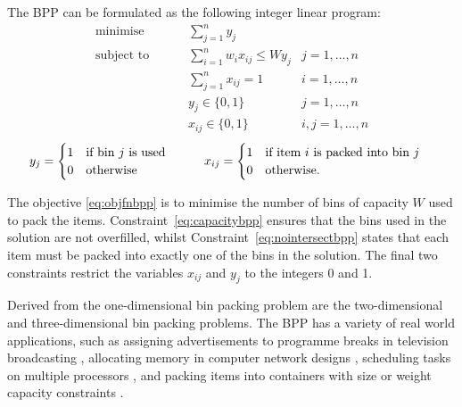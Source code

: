 \documentclass[a4paper,11pt]{article}
\begin{document}
The BPP can be formulated as the following integer linear program:
\begin{subequations}
	\begin{align}
	\text{minimise  } &\qquad \sum_{j=1}^{n} y_j & \label{eq:objfnbpp}\\[3pt]
	\text{subject to  } &\qquad \sum_{i = 1}^{n} w_i x_{ij} \leq W y_j & j = 1,\dotsc,n \label{eq:capacitybpp} \\[3pt]
	&\qquad \sum_{j=1}^{n} x_{ij} = 1 &i = 1,\dotsc,n \label{eq:nointersectbpp} \\[3pt]
	&\qquad y_j \in \{0,1\} &j = 1,\dotsc,n \label{eq:binarybppy} \\[3pt]
	&\qquad x_{ij} \in \{0,1\} &i,j = 1,\dotsc,n \label{eq:binarybppx}
	\end{align}
\end{subequations}
\begin{alignat*}{2}
& \begin{aligned} & 
y_j = 
\begin{cases}
1 & \text{if bin } j \text{ is used} \\
0 & \text{otherwise} \\
\end{cases} \\
\end{aligned}
& \hskip 2em 
& \begin{aligned} & 
x_{ij} = 
\begin{cases}
1 & \text{if item } i \text{ is packed into bin } j \\
0 & \text{otherwise.} \\
\end{cases} \\
\end{aligned}
\end{alignat*}
\vspace{3pt}

\noindent The objective \ref{eq:objfnbpp} is to minimise the number of bins of capacity $W$ used to pack the items. Constraint~\ref{eq:capacitybpp} ensures that the bins used in the solution are not overfilled, whilst Constraint~\ref{eq:nointersectbpp} states that each item must be packed into exactly one of the bins in the solution. The final two constraints restrict the variables $x_{ij}$ and $y_j$ to the integers 0 and 1.

Derived from the one-dimensional bin packing problem are the two-dimensional \citep{lodi2002} and three-dimensional \citep{martello2000} bin packing problems. The BPP has a variety of real world applications, such as assigning advertisements to programme breaks in television broadcasting \citep{brown1971}, allocating memory in computer network designs \citep{chandra1978}, scheduling tasks on multiple processors \citep{coffman1978, vandevel1991}, and packing items into containers with size or weight capacity constraints \citep{eilon1971, hung1978}.
\end{document}
